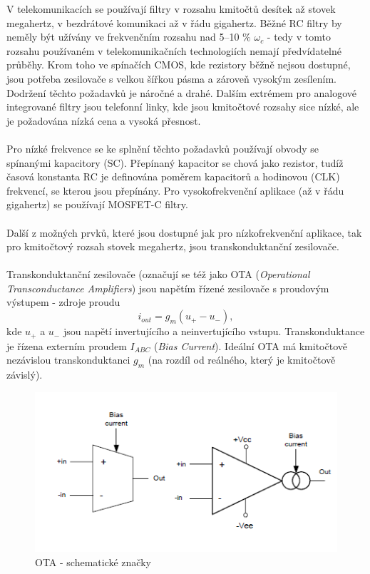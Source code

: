 V telekomunikacích se používají filtry v rozsahu kmitočtů desítek až stovek megahertz, v bezdrátové komunikaci až v řádu gigahertz. Běžné RC filtry by neměly být užívány ve frekvenčním rozsahu nad 5--10 $\%$ $\omega _c$ - tedy v tomto rozsahu používaném v telekomunikačních technologiích nemají předvídatelné průběhy. Krom toho ve spínačích CMOS, kde rezistory běžně nejsou dostupné, jsou potřeba zesilovače s velkou šířkou pásma a zároveň vysokým zesílením. Dodržení těchto požadavků je náročné a drahé. Dalším extrémem pro analogové integrované filtry jsou telefonní linky, kde jsou kmitočtové rozsahy sice nízké, ale je požadována nízká cena a vysoká přesnost.\\
\\
Pro nízké frekvence se ke splnění těchto požadavků používají obvody se spínanými kapacitory (SC). Přepínaný kapacitor se chová jako rezistor, tudíž časová konstanta RC je definována poměrem kapacitorů a hodinovou (CLK) frekvencí, se kterou jsou přepínány. Pro vysokofrekvenční aplikace (až v řádu gigahertz) se používají MOSFET-C filtry.\\
\\
Další z možných prvků, které jsou dostupné jak pro nízkofrekvenční aplikace, tak pro kmitočtový rozsah stovek megahertz, jsou transkonduktanční zesilovače.\\
\\
Transkonduktanční zesilovače (označují se též jako OTA (\textit{Operational Transconductance Amplifiers}) jsou napětím řízené zesilovače s proudovým výstupem - zdroje proudu
\begin{equation}
i_{out} = g_m(u_+ - u_-),
\end{equation}
kde $u_+$ a $u_-$ jsou napětí invertujícího a neinvertujícího vstupu.  Transkonduktance je řízena externím proudem $I_{ABC}$ (\textit{Bias Current}). Ideální OTA má kmitočtově nezávislou transkonduktanci $g_m$ (na rozdíl od reálného, který je kmitočtově závislý).
\begin{figure}[h]
\centering
\includegraphics[scale=0.7]{image7.png}
\caption[OTA - schematické značky]{OTA - schematické značky \cite{4}}
\end{figure}
